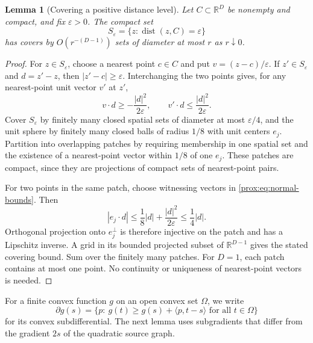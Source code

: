 \documentclass[11pt,letterpaper]{amsart}
\newtheorem{lemma}[theorem]{Lemma}
\theoremstyle{definition}
\theoremstyle{remark}
\numberwithin{equation}{section}
\DeclareMathOperator{\dist}{dist}
\begin{document}
\begin{lemma}[Covering a positive distance level]\label{prox:lem:level}
Let $C\subset\mathbb R^D$ be nonempty and compact, and fix
$\varepsilon>0$. The compact set
\[
 S_\varepsilon=\{z:\dist(z,C)=\varepsilon\}
\]
has covers by $O(r^{-(D-1)})$ sets of diameter at most $r$ as
$r\downarrow0$.
\end{lemma}
\begin{proof}
For $z\in S_\varepsilon$, choose a nearest point $c\in C$ and put
$v=(z-c)/\varepsilon$. If $z'\in S_\varepsilon$ and $d=z'-z$,
then $|z'-c|\ge\varepsilon$. Interchanging the two points gives,
for any nearest-point unit vector $v'$ at $z'$,
\begin{equation}\label{prox:eq:normal-bounds}
 v\cdot d\ge-\frac{|d|^2}{2\varepsilon},\qquad
 v'\cdot d\le\frac{|d|^2}{2\varepsilon}.
\end{equation}
Cover $S_\varepsilon$ by finitely many closed spatial sets of
diameter at most $\varepsilon/4$, and the unit sphere by finitely
many closed balls of radius $1/8$ with unit centers $e_j$.
Partition into overlapping patches by requiring membership in
one spatial set and the existence of a nearest-point vector
within $1/8$ of one $e_j$. These patches are compact, since they
are projections of compact sets of nearest-point pairs.

For two points in the same patch, choose witnessing vectors in
\eqref{prox:eq:normal-bounds}. Then
\[
 |e_j\cdot d|\le\frac18|d|+
           \frac{|d|^2}{2\varepsilon}\le\frac14|d|.
\]
Orthogonal projection onto $e_j^\perp$ is therefore injective on
the patch and has a Lipschitz inverse. A grid in its bounded
projected subset of $\mathbb R^{D-1}$ gives the stated covering
bound. Sum over the finitely many patches. For $D=1$, each
patch contains at most one point. No continuity or uniqueness
of nearest-point vectors is needed.
\end{proof}

For a finite convex function $g$ on an open convex set $\Omega$, we
write
\[
 \partial g(s)=\{p:\ g(t)\ge g(s)+\langle p,t-s\rangle
                         \text{ for all }t\in\Omega\}
\]
for its convex subdifferential. The next lemma uses subgradients that
differ from the gradient $2s$ of the quadratic source graph.
\end{document}
